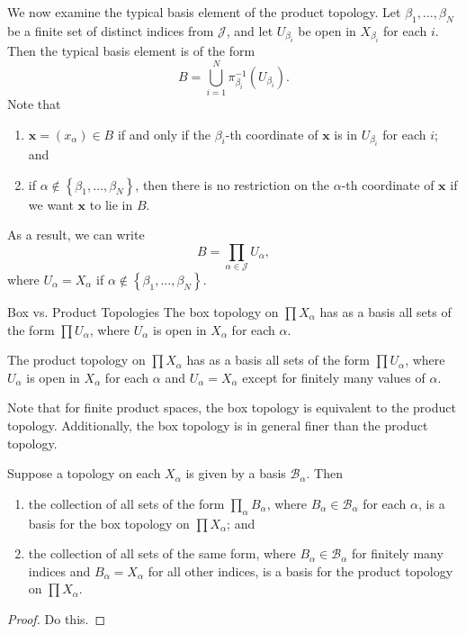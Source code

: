 \documentclass[10pt]{report}
\begin{document}
We now examine the typical basis element of the product topology. Let $\beta_1, \dots, \beta_N$ be a finite set of distinct indices from $\mathcal{J}$, and let $U_{\beta_i}$ be open in $X_{\beta_i}$ for each $i$. Then the typical basis element is of the form
\[
	B = \bigcup_{i=1}^N \pi_{\beta_i}^{-1}(U_{\beta_i}).
\] Note that
\begin{enumerate}
	\item $\mathbf{x}=(x_{\alpha}) \in B$ if and only if the $\beta_i$-th coordinate of $\mathbf{x}$ is in $U_{\beta_i}$ for each $i$; and
	\item if $\alpha \not\in \left\{ \beta_1, \dots, \beta_N \right\}$, then there is no restriction on the $\alpha$-th coordinate of $\mathbf{x}$ if we want $\mathbf{x}$ to lie in $B$.
\end{enumerate}
As a result, we can write
\[
B = \prod_{\alpha\in\mathcal{J}}U_{\alpha},
\] where $U_{\alpha}=X_{\alpha}$ if $\alpha \not\in \left\{ \beta_1, \dots, \beta_N \right\}$.

\begin{note}{Box vs. Product Topologies}{}
The box topology on $\prod X_{\alpha}$ has as a basis all sets of the form $\prod U_{\alpha}$, where $U_{\alpha}$ is open in $X_{\alpha}$ for each $\alpha$.

The product topology on $\prod X_{\alpha}$ has as a basis all sets of the form $\prod U_{\alpha}$, where $U_{\alpha}$ is open in $X_{\alpha}$ for each $\alpha$ and $U_{\alpha}=X_{\alpha}$ except for finitely many values of $\alpha$.
\end{note}

Note that for finite product spaces, the box topology is equivalent to the product topology. Additionally, the box topology is in general finer than the product topology.

\begin{thrm}{}{}
Suppose a topology on each $X_{\alpha}$ is given by a basis $\mathcal{B}_{\alpha}$. Then
\begin{enumerate}
	\item the collection of all sets of the form $\prod_{\alpha}B_{\alpha}$, where $B_{\alpha}\in \mathcal{B}_{\alpha}$ for each $\alpha$, is a basis for the box topology on $\prod X_{\alpha}$; and
	\item the collection of all sets of the same form, where $B_{\alpha}\in \mathcal{B}_{\alpha}$ for finitely many indices and $B_{\alpha}=X_{\alpha}$ for all other indices, is a basis for the product topology on $\prod X_{\alpha}$.
\end{enumerate}
\end{thrm}
\begin{proof}
{\color{red}Do this.}
\end{proof}
\end{document}
